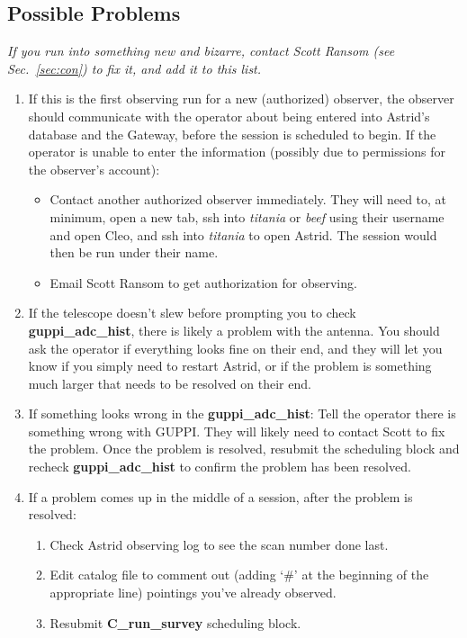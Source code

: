 \documentclass[11pt]{article}
\begin{document}
\subsection{Possible Problems} \label{ssec:prob}  %
\textit{If you run into something new and bizarre, contact Scott Ransom (see Sec.~\ref{sec:con}) to fix it, and add it to this list.}
\begin{enumerate}
\item If this is the first observing run for a new (authorized) observer, the observer should communicate with the operator about being entered into Astrid's database and the Gateway, before the session is scheduled to begin.  If the operator is unable to enter the information (possibly due to permissions for the observer's account):   \begin{itemize}
\item Contact another authorized observer immediately.  They will need to, at minimum, open a new tab, ssh into {\it titania} or {\it beef} using their username and open Cleo, and ssh into \textit{titania} to open Astrid.  The session would then be run under their name.  
\item Email Scott Ransom to get authorization for observing.  
\end{itemize}

\item\label{st:slew} If the telescope doesn't slew before prompting you to check {\bf guppi\_adc\_hist}, there is likely a problem with the antenna.  You should ask the operator if everything looks fine on their end, and they will let you know if you simply need to restart Astrid, or if the problem is something much larger that needs to be resolved on their end.  

\item\label{st:gah} If something looks wrong in the \textbf{guppi\_adc\_hist}: 
\indent Tell the operator there is something wrong with GUPPI.  They will likely need to contact Scott to fix the problem.  Once the problem is resolved, resubmit the scheduling block and recheck \textbf{guppi\_adc\_hist} to confirm the problem has been resolved. 

\item If a problem comes up in the middle of a session, after the problem is resolved: \begin{enumerate}
\item Check Astrid observing log to see the scan number done last. 
\item Edit catalog file to comment out (adding `\#' at the beginning of the appropriate line) pointings you've already observed. 
\item Resubmit \textbf{C\_run\_survey} scheduling block.  
\end{enumerate}

\end{enumerate}
\end{document}
